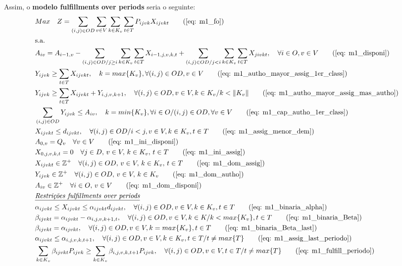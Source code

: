 Assim, o \textbf{modelo fulfillments over periods} seria o seguinte:
\allowdisplaybreaks
\begin{align}
	& Max \quad Z = \sum_{(i,j)\in OD} \sum_{v\in V} \sum_{k\in K_v} \sum_{t\in T} P_{ijvk} X_{ijvkt}     \tag{\ref{eq: m1_fo}}   \\
	& \text{s.a.}  \notag \\
	& A_{iv} = A_{i-1,v} - \sum_{(i,j) \in OD/j \geq i} \sum_{k\in K_v}\sum_{t\in T}X_{i-1,j,v,k,t} + \sum_{(i,j) \in OD/j<i} \sum_{k\in K_v}\sum_{t\in T}X_{jivkt}, \quad \forall i \in O, v \in V   \tag{\ref{eq: m1_disponi}} \\
	& Y_{ijvk} \geq  \sum_{t \in T} X_{ijvkt},  \quad k = max\{K_v\}, \forall(i,j) \in OD ,v \in V     \tag{\ref{eq: m1_autho_mayor_assig_1er_class}} \\
	& Y_{ijvk} \geq  \sum_{t \in T} X_{ijvkt} + Y_{i,j,v,k + 1} , \quad \forall(i,j) \in OD, v \in V, k \in K_v / k < \lVert K_v \rVert   \tag{\ref{eq: m1_autho_mayor_assig_mas_autho}} \\
	& \sum_{(i,j) \in OD} Y_{ijvk} \leq A_{iv}, \quad  k = min\{K_v\}, \forall i \in O / (i,j) \in OD,   \forall v \in V       \tag{\ref{eq: m1_cap_autho_1er_class}} \\
	& X_{ijvkt} \leq d_{ijvkt},  \quad \forall (i,j) \in OD / i < j  ,v \in V, k \in K_v, t\in T   \tag{\ref{eq: m1_assig_menor_dem}} \\
	& A_{0,v} = Q_v \quad \forall v \in V  \tag{\ref{eq: m1_ini_disponi}} \\ 
	& X_{0,j,v,k,t} = 0 \quad \forall j \in D,\, v \in V,\, k \in K_v,\, t \in T  \tag{\ref{eq: m1_ini_assig}} \\ 
	& X_{ijvkt} \in \mathbb{Z}^+ \quad \forall(i,j) \in OD,\, v \in V,\, k \in K_v,\, t \in T  \tag{\ref{eq: m1_dom_assig}} \\ 
	& Y_{ijvk} \in \mathbb{Z}^+ \quad \forall(i,j) \in OD,\, v \in V,\, k \in K_v  \tag{\ref{eq: m1_dom_autho}} \\ 
	& A_{iv} \in \mathbb{Z}^+ \quad \forall i \in O,\, v \in V  \tag{\ref{eq: m1_dom_disponi}} \\
	& \textit{\underline{Restrições fulfillments over periods}}         \notag   \\
	& \alpha_{ijvkt} \leq X_{ijvkt} \leq \alpha_{ijvkt}d_{ijvkt}, \quad   \forall(i,j) \in OD, v \in V, k \in K_v, t \in T   \tag{\ref{eq: m1_binaria_alpha}} \\
	& \beta_{ijvkt} = \alpha_{ijvkt} - \alpha_{i,j,v,k+1,t}, \quad \forall (i,j) \in OD, v \in V, k \in K /k < max\{K_v\}, t\in T    \tag{\ref{eq: m1_binaria_Beta}}   \\
	& \beta_{ijvkt} = \alpha_{ijvkt}, \quad   \forall(i,j) \in OD, v \in V, k = max\{K_v\}, t \in T    \tag{\ref{eq: m1_binaria_Beta_last}}   \\
	& \alpha_{ijvkt} \leq \alpha_{i,j,v,k,t+1}, \quad   \forall(i,j) \in OD, v \in V, k \in K_v, t \in T/ t \neq max\{T\}     \tag{\ref{eq: m1_assig_last_periodo}}   \\
	& \sum_{k \in K_v}\beta_{ijvkt}P_{ijvk} \geq \sum_{k \in K_v}\beta_{i,j,v,k,t+1}P_{ijvk},  \quad   \forall(i,j) \in OD, v \in V, t \in T/ t \neq max\{T\}   \tag{\ref{eq: m1_fulfill_periodo}}
\end{align}


